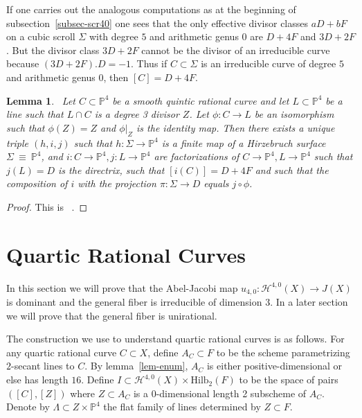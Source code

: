 \documentclass[amssymb,twoside,12 pt,amscd,reqno]{amsart}
\theoremstyle{plain}
\newtheorem{lem}[thm]{Lemma}
\theoremstyle{definition}
\newcommand{\Hdg}[2]{\mathcal{H}^{#1,#2}}
\newcommand{\PP}{\mathbb{P}}
\newcommand{\HI}[2]{\text{Hilb}_{#1}(#2)}
\def\ps{\vspace{4pt}}
\begin{document}
If one carries out the analogous computations as at the beginning of
subsection~\ref{subsec-scr40} one sees that the only effective divisor
classes $aD+bF$ on a cubic scroll $\Sigma$ with degree $5$ and
arithmetic genus $0$ are $D+4F$ and $3D+2F$.  But the divisor class
$3D+2F$ cannot be the divisor of an irreducible curve because
$(3D+2F).D = -1$.  Thus if $C\subset \Sigma$ is an irreducible curve
of degree $5$ and arithmetic genus $0$, then $[C]=D+4F$.  

\begin{lem}~\label{lem-scr50}
Let $C\subset \PP^4$ be a smooth quintic rational curve
and let $L\subset \PP^4$ be a line such that $L\cap C$ is a degree 3
divisor $Z$.  Let $\phi:C\rightarrow L$ be an isomorphism such that
$\phi(Z)=Z$ and $\phi|_Z$ is the identity map.  Then there exists a
unique triple $(h,i,j)$ such that $h:\Sigma\rightarrow\PP^4$ is a
finite map of a Hirzebruch surface $\Sigma~\equiv~\PP^4$, and
$i:C\rightarrow\PP^4, j:L\rightarrow\PP^4$ are factorizations of
$C\rightarrow\PP^4, L\rightarrow\PP^4$ such that $j(L)=D$ is the
directrix, such that $[i(C)]=D+4F$ and such that the composition of
$i$ with the projection $\pi:\Sigma \rightarrow D$ equals $j\circ
\phi$.  
\end{lem}

\begin{proof}
This is ~\cite[lemma 6.12]{HRS1}.
\end{proof}

\section{Quartic Rational Curves}

In this section we will prove that the Abel-Jacobi map
$u_{4,0}:\Hdg{4}{0}(X)\rightarrow J(X)$ is dominant and the general
fiber is irreducible of dimension $3$.  In a later section we will
prove that the general fiber is unirational.

\ps

The construction we use to understand quartic rational curves is as
follows.  For any quartic rational curve
$C\subset X$, define $A_C\subset F$ to be the scheme parametrizing
$2$-secant lines to $C$.  By lemma~\ref{lem-enum}, $A_C$ is either
positive-dimensional or else has length $16$.  Define $I\subset
\Hdg{4}{0}(X)\times \HI{2}{F}$ to be the space of pairs $([C],[Z])$
where $Z\subset A_C$ is a $0$-dimensional length 2 subscheme of $A_C$.  
Denote by $\Lambda\subset Z\times \PP^4$ the flat family of lines
determined by $Z\subset F$.  
\end{document}
